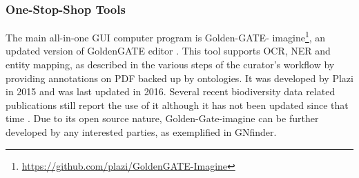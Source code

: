    \subsubsection{One-Stop-Shop Tools}
The main all-in-one GUI computer program is Golden-GATE-
imagine\footnote{\url{https://github.com/plazi/GoldenGATE-Imagine}}, an updated
version of GoldenGATE editor \citep{sautter_semi-automated_2007}. This tool
supports OCR, NER and entity mapping, as described in the various steps of the
curator’s workflow by providing annotations on PDF backed up by ontologies. It
was developed by Plazi in 2015 and was last updated in 2016. Several recent
biodiversity data related publications still report the use of it although it
has not been updated since that time
\citep{10.3897/biss.3.37078,rivera-quiroz_extracting_2019,10.3897/biss.4.59178}.
Due to its open source nature, Golden-Gate-imagine can be further developed by
any interested parties, as exemplified in GNfinder.

\begin{table}[ht]
\large
{}
\caption{The platforms where the CLI workflow was tested.Please note that running time can be affected by internet speed and stability due to API calls. The workflow uses open source tools and software libraries that are distributed across the major platforms; Linux, Mac and Windows.}
\label{table-CLI}
\end{table}

